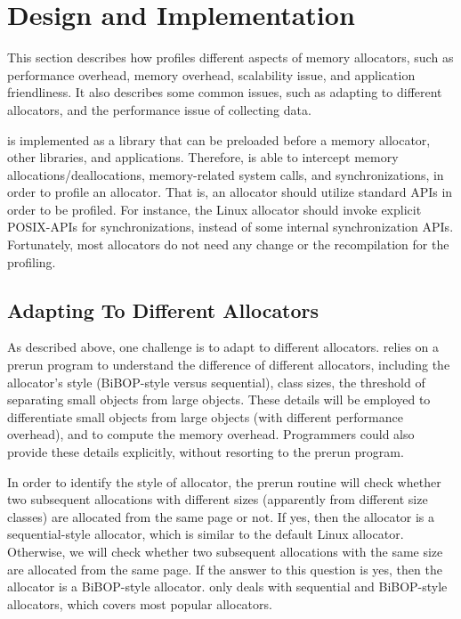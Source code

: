 \section{Design and Implementation}
\label{sec:implementation}

This section describes how \MP{} profiles different aspects of memory allocators, such as performance overhead, memory overhead, scalability issue, and application friendliness. It also describes some common issues, such as adapting to different allocators, and the performance issue of collecting data. 

\MP{} is implemented as a library that can be preloaded before a memory allocator, other libraries, and applications. Therefore, \MP{} is able to intercept memory allocations/deallocations, memory-related system calls, and synchronizations, in order to profile an allocator. That is, an allocator should utilize standard APIs in order to be profiled. For instance, the Linux allocator should invoke explicit POSIX-APIs for synchronizations, instead of some internal synchronization APIs. Fortunately, most allocators do not need any change or the recompilation for the profiling.    

\subsection{Adapting To Different Allocators}

\label{sec:understandingallocators}

As described above, one challenge is to adapt \MP{} to different allocators. \MP{} relies on a prerun program to understand the difference of different allocators, including the allocator's style (BiBOP-style versus sequential), class sizes, the threshold of separating small objects from large objects. These details will be employed to differentiate small objects from large objects (with different performance overhead), and to compute the memory overhead. Programmers could also provide these details explicitly, without resorting to the prerun program.  

In order to identify the style of allocator, the prerun routine will check whether two subsequent allocations with different sizes (apparently from different size classes) are allocated from the same page or not. If yes, then the allocator is a sequential-style allocator, which is similar to the default Linux allocator. Otherwise, we will check whether two subsequent allocations with the same size are allocated from the same page. If the answer to this question is yes, then the allocator is a BiBOP-style allocator. \MP{} only deals with sequential and BiBOP-style allocators, which covers most popular allocators.  

